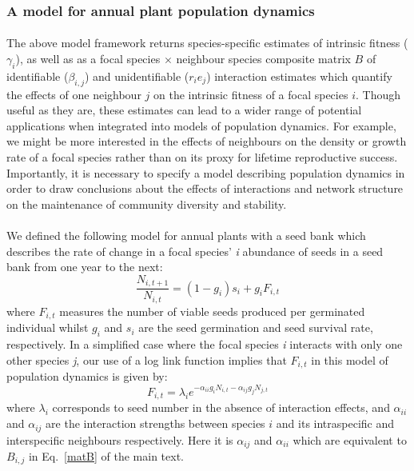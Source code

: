 \begin{refsection}
        \subsubsection{A model for annual plant population dynamics}
        \label{SI:popdyn}

        \paragraph{}
        The above model framework returns species-specific estimates of intrinsic fitness ($\gamma_i$), as well as as a focal species $\times$ neighbour species composite matrix $B$ of identifiable ($\beta_{i, j}$) and unidentifiable ($r_{i} e_j$) interaction estimates which quantify the effects of one neighbour $j$ on the intrinsic fitness of a focal species $i$. Though useful as they are, these estimates can lead to a wider range of potential applications when integrated into models of population dynamics. For example, we might be more interested in the effects of neighbours on the density or growth rate of a focal species rather than on its proxy for lifetime reproductive success. Importantly, it is necessary to specify a model describing population dynamics in order to draw conclusions about the effects of interactions and network structure on the maintenance of community diversity and stability. 

        \paragraph{} 
        We defined the following model for annual plants with a seed bank \parencite{Levine2009, Mayfield2017, Bimler2018} which describes the rate of change in a focal species' \textit{i} abundance of seeds in a seed bank from one year to the next: 
            \begin{equation}
                \frac{N_{i, t+1}}{N_{i, t}} = \left( 1 - g_{i} \right) s_{i} + g_{i}F_{i, t}
                \label{ifm}
            \end{equation}
        where \(F_{i,t}\) measures the number of viable seeds produced per germinated individual whilst \(g_{i}\) and \(s_{i}\) are the seed germination and seed survival rate, respectively. In a simplified case where the focal species \textit{i} interacts with only one other species \textit{j}, our use of a log link function implies that \(F_{i,t}\) in this model of population dynamics is given by:
            \begin{equation}
                F_{i,t} = \lambda_{i} e^{- \alpha_{ii} g_{i} N_{i, t} -  \alpha_{ij} g_{j} N_{j, t} }
                \label{fecundity}   
            \end{equation}
        where \(\lambda_{i}\) corresponds to seed number in the absence of interaction effects, and \(\alpha_{ii}\) and \(\alpha_{ij}\) are the interaction strengths between species \(i\) and its intraspecific and interspecific neighbours respectively. Here it is \(\alpha_{ij}\) and \(\alpha_{ii}\) which are equivalent to \(B_{i, j}\) in Eq.~\ref{matB} of the main text.


\end{refsection}
